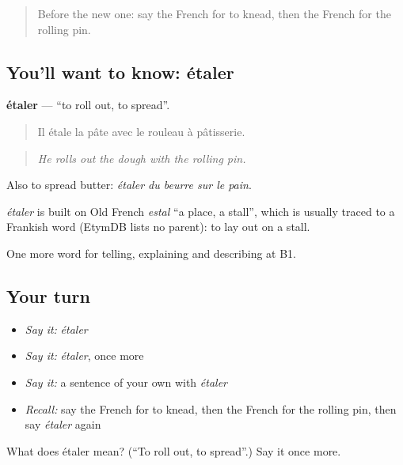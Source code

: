 \begin{quote}
Before the new one: say the French for to knead, then the French for the rolling pin.
\end{quote}

\subsection*{You'll want to know: étaler}
\textbf{étaler} — \textquotedblleft{}to roll out, to spread\textquotedblright{}.

\begin{quote}
Il étale la pâte avec le rouleau à pâtisserie.
\end{quote}

\begin{quote}
\emph{He rolls out the dough with the rolling pin.}
\end{quote}

Also to spread butter: \emph{étaler du beurre sur le pain}.

\begin{cousinweb}
\emph{étaler} is built on Old French \emph{estal} \textquotedblleft{}a place, a stall\textquotedblright{}, which is usually traced to a Frankish word (EtymDB lists no parent): to lay out on a stall.
\end{cousinweb}

\begin{grammarlens}[title={What you've built}]
One more word for telling, explaining and describing at B1.
\end{grammarlens}

\subsection*{Your turn}
\begin{itemize}
\raggedright
  \item \emph{Say it:} \emph{étaler}
  \item \emph{Say it:} \emph{étaler}, once more
  \item \emph{Say it:} a sentence of your own with \emph{étaler}
  \item \emph{Recall:} say the French for to knead, then the French for the rolling pin, then say \emph{étaler} again
\end{itemize}

\begin{tcolorbox}[breakable,colback=teal!4,colframe=teal!35!black,title={Before you move on}]
What does étaler mean? (\textquotedblleft{}To roll out, to spread\textquotedblright{}.) Say it once more.
\end{tcolorbox}
